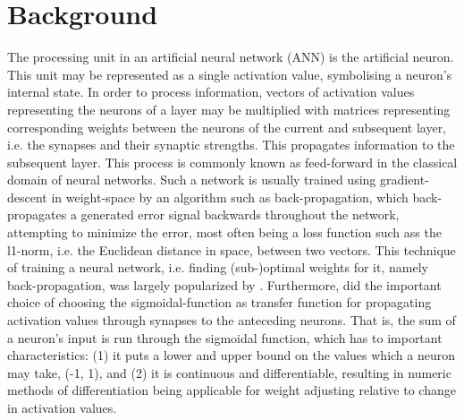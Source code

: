 
\chapter{Background}\label{chpt:background}

The processing unit in an artificial neural network (ANN) is the artificial neuron. This unit may be represented as a single activation value, symbolising a neuron's internal state. In order to process information, vectors of activation values representing the neurons of a layer may be multiplied with matrices representing corresponding weights between the neurons of the current and subsequent layer, i.e. the synapses and their synaptic strengths. This propagates information to the subsequent layer. This process is commonly known as feed-forward in the classical domain of neural networks. Such a network is usually trained using gradient-descent in weight-space by an algorithm such as back-propagation, which back-propagates a generated error signal backwards throughout the network, attempting to minimize the error, most often being a loss function such ass the l1-norm, i.e. the Euclidean distance in space, between two vectors. This technique of training a neural network, i.e. finding (sub-)optimal weights for it, namely back-propagation, was largely popularized by \cite{Rumelhart1986}. Furthermore, \cite{Rumelhart1986} did the important choice of choosing the sigmoidal-function as transfer function for propagating activation values through synapses to the anteceding neurons. That is, the sum of a neuron's input is run through the sigmoidal function, which has to important characteristics: (1) it puts a lower and upper bound on the values which a neuron may take, (-1, 1), and (2) it is continuous and differentiable, resulting in numeric methods of differentiation being applicable for weight adjusting relative to change in activation values.

